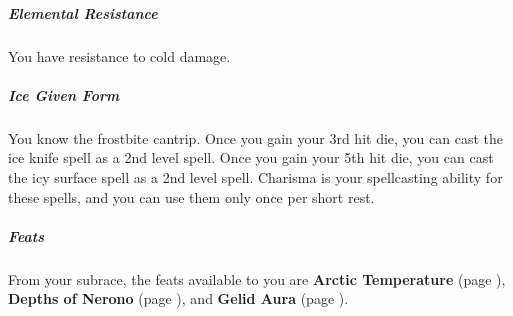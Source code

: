     \subparagraph{Elemental Resistance} You have resistance to cold damage.

    \subparagraph{Ice Given Form} You know the frostbite cantrip.
    Once you gain your 3rd hit die, you can cast the ice knife spell as a 2nd level spell.
    Once you gain your 5th hit die, you can cast the icy surface spell as a 2nd level spell.
    Charisma is your spellcasting ability for these spells, and you can use them only once per short rest.

    \subparagraph{Feats} From your subrace, the feats available to you are
    \textbf{Arctic Temperature} (page \pageref{feat::arctictemperature}),
    \textbf{Depths of Nerono} (page \pageref{feat::depthsofnerono}), and
    \textbf{Gelid Aura} (page \pageref{feat::gelidaura}).


\newpage
